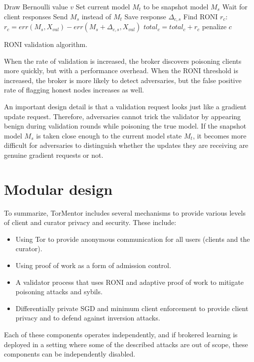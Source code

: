 \begin{algorithm}[t]
   {
    Draw Bernoulli value $v$\;
     {
      Set current model $M_t$ to be snapshot model $M_s$\;
      Wait for client responses\;
    }
     {
      Send $M_s$ instead of $M_t$\;
      Save response $\Delta_{c,s}$
    }
     {
       Find RONI $r_c$:
       $r_c = err(M_s, X_{val}) - err(M_s + \Delta_{c,s}, X_{val})$\; 
       $total_c = total_c + r_c$\;
       {
        penalize $c$\;
      }
    }
  }
  \caption{RONI validation algorithm. \label{alg:roni}}
\end{algorithm}

When the rate of validation is increased, the broker discovers
poisoning clients more quickly, but with a performance overhead. When
the RONI threshold is increased, the broker is more likely to detect
adversaries, but the false positive rate of flagging honest nodes
increases as well.

An important design detail is that a validation request looks just
like a gradient update request. Therefore, adversaries cannot
trick the validator by appearing benign during validation rounds while
poisoning the true model. If the snapshot model $M_s$ is taken close
enough to the current model state $M_t$, it becomes more difficult for
adversaries to distinguish whether the updates they are receiving are
genuine gradient requests or not.

\section{Modular design}

To summarize, TorMentor includes several mechanisms to provide
various levels of client and curator privacy and security. These
include:
\begin{itemize}[label=$\star$]
    \item Using Tor to provide anonymous communication for all users 
    (clients and the curator).
    \item Using proof of work as a form of admission control.
    \item A validator process that uses RONI and adaptive proof of work
        to mitigate poisoning attacks and sybils.
    \item Differentially private SGD and minimum client enforcement to
        provide client privacy and to defend against inversion attacks.
\end{itemize}

Each of these components operates independently, and if brokered
learning is deployed in a setting where some of the described attacks
are out of scope, these components can be independently disabled. %
